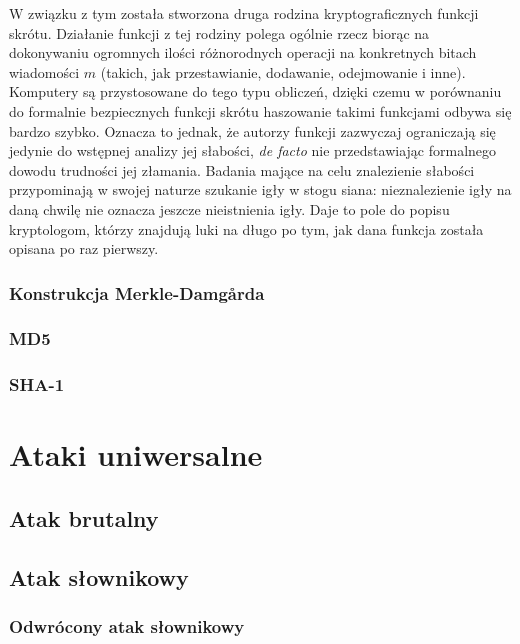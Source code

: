 \documentclass[12pt,a4paper,twoside]{article}
\begin{document}
W związku z tym została stworzona druga rodzina kryptograficznych funkcji
skrótu. Działanie funkcji z tej rodziny polega ogólnie rzecz biorąc na
dokonywaniu ogromnych ilości różnorodnych operacji na konkretnych bitach
wiadomości $m$ (takich, jak przestawianie, dodawanie, odejmowanie i inne).
Komputery są przystosowane do tego typu obliczeń, dzięki czemu w porównaniu do
formalnie bezpiecznych funkcji skrótu haszowanie takimi funkcjami odbywa się
bardzo szybko. Oznacza to jednak, że autorzy funkcji zazwyczaj ograniczają się
jedynie do wstępnej analizy jej słabości, \textit{de facto} nie przedstawiając
formalnego dowodu trudności jej złamania. Badania mające na celu znalezienie
słabości przypominają w swojej naturze szukanie igły w stogu siana:
nieznalezienie igły na daną chwilę nie oznacza jeszcze nieistnienia igły. Daje
to pole do popisu kryptologom, którzy znajdują luki na długo po tym, jak dana
funkcja została opisana po raz pierwszy.

\subsubsection{Konstrukcja Merkle-Damg\r{a}rda}

\subsubsection{MD5}

\subsubsection{SHA-1}

\section{Ataki uniwersalne}
\label{sec:universal_attacks}

\subsection{Atak brutalny}

\subsection{Atak słownikowy}

\subsubsection{Odwrócony atak słownikowy}
\end{document}
